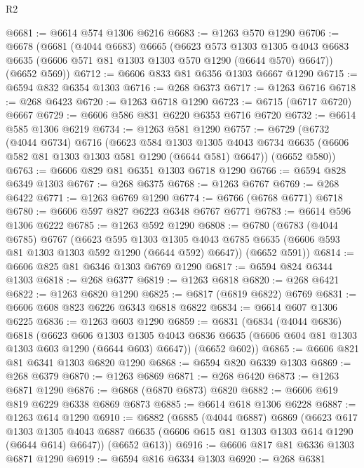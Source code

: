 \begin{lexlean}{R2}
\begin{coremodule}
@6681 := @6614 @574 @1306 @6216
@6683 := @1263 @570 @1290
@6706 := @6678
    (@6681
      (@4044 @6683)
      @6665
      (@6623
        @573
        @1303
        @1305
        @4043
        @6683
        @6635
        (@6606 @571 @81 @1303 @1303 @570 @1290 (@6644 @570) @6647))
      (@6652 @569))
@6712 := @6606 @833 @81 @6356 @1303 @6667 @1290
@6715 := @6594 @832 @6354 @1303
@6716 := @268 @6373
@6717 := @1263 @6716
@6718 := @268 @6423
@6720 := @1263 @6718 @1290
@6723 := @6715 (@6717 @6720) @6667
@6729 := @6606 @586 @831 @6220 @6353 @6716 @6720
@6732 := @6614 @585 @1306 @6219
@6734 := @1263 @581 @1290
@6757 := @6729
    (@6732
      (@4044 @6734)
      @6716
      (@6623
        @584
        @1303
        @1305
        @4043
        @6734
        @6635
        (@6606 @582 @81 @1303 @1303 @581 @1290 (@6644 @581) @6647))
      (@6652 @580))
@6763 := @6606 @829 @81 @6351 @1303 @6718 @1290
@6766 := @6594 @828 @6349 @1303
@6767 := @268 @6375
@6768 := @1263 @6767
@6769 := @268 @6422
@6771 := @1263 @6769 @1290
@6774 := @6766 (@6768 @6771) @6718
@6780 := @6606 @597 @827 @6223 @6348 @6767 @6771
@6783 := @6614 @596 @1306 @6222
@6785 := @1263 @592 @1290
@6808 := @6780
    (@6783
      (@4044 @6785)
      @6767
      (@6623
        @595
        @1303
        @1305
        @4043
        @6785
        @6635
        (@6606 @593 @81 @1303 @1303 @592 @1290 (@6644 @592) @6647))
      (@6652 @591))
@6814 := @6606 @825 @81 @6346 @1303 @6769 @1290
@6817 := @6594 @824 @6344 @1303
@6818 := @268 @6377
@6819 := @1263 @6818
@6820 := @268 @6421
@6822 := @1263 @6820 @1290
@6825 := @6817 (@6819 @6822) @6769
@6831 := @6606 @608 @823 @6226 @6343 @6818 @6822
@6834 := @6614 @607 @1306 @6225
@6836 := @1263 @603 @1290
@6859 := @6831
    (@6834
      (@4044 @6836)
      @6818
      (@6623
        @606
        @1303
        @1305
        @4043
        @6836
        @6635
        (@6606 @604 @81 @1303 @1303 @603 @1290 (@6644 @603) @6647))
      (@6652 @602))
@6865 := @6606 @821 @81 @6341 @1303 @6820 @1290
@6868 := @6594 @820 @6339 @1303
@6869 := @268 @6379
@6870 := @1263 @6869
@6871 := @268 @6420
@6873 := @1263 @6871 @1290
@6876 := @6868 (@6870 @6873) @6820
@6882 := @6606 @619 @819 @6229 @6338 @6869 @6873
@6885 := @6614 @618 @1306 @6228
@6887 := @1263 @614 @1290
@6910 := @6882
    (@6885
      (@4044 @6887)
      @6869
      (@6623
        @617
        @1303
        @1305
        @4043
        @6887
        @6635
        (@6606 @615 @81 @1303 @1303 @614 @1290 (@6644 @614) @6647))
      (@6652 @613))
@6916 := @6606 @817 @81 @6336 @1303 @6871 @1290
@6919 := @6594 @816 @6334 @1303
@6920 := @268 @6381

\end{coremodule}
\end{lexlean}
